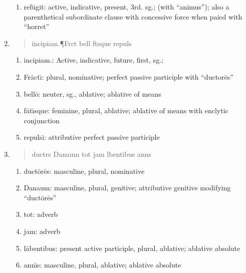 \documentclass[]{article}
\newcommand{\latify}[1]{
        \Large
        \begin{verse}
          \begin{metrica}
          {#1}\\
          \end{metrica}
        \end{verse}
        \normalsize
}
\begin{document}
\begin{enumerate}
\begin{enumerate}
	\item ref\={u}git: active, indicative, present, 3rd. sg.; (with ``animus''); also a parenthetical subordinate clause with
				concessive force when paied with ``horret''

\end{enumerate}

\item \latify{incipiam.{\P}Fr{}ct{\macron {\i}} bell{\macron {o}} f{\macron {a}}t{\macron {\i}}sque repuls{\macron {\i}}}
\begin{enumerate}

	\item incipiam.:   Active, indicative, future, first, sg.;

	\item Fr\={a}ct\={\i}:  plural, nominative; perfect passive participle with ``ductor\={e}s''

	\item bell\={o}:  neuter, sg., ablative; ablative of means

	\item f\={a}t\={\i}sque: feminine, plural, ablative; ablative of means with enclytic conjunction

	\item repuls\={\i}:  attributive perfect passive participle

\end{enumerate}

\item \latify{duct{}r{}s Danaum tot jam l{\macron {a}}bentibus ann{\macron {\i}}s}
\begin{enumerate}

	\item duct\={o}r\={e}s:  masculine, plural, nominative

	\item Danaum: masculine, plural, genitive; attributive genitive modifying ``duct\={o}r\={e}s''

	\item tot:  adverb

	\item jam: adverb

	\item l\={a}bentibus: present active participle, plural, ablative; ablative absolute

	\item ann\={\i}s:  masculine, plural, ablative; ablative absolute
\end{enumerate}



\end{enumerate}
\end{document}
